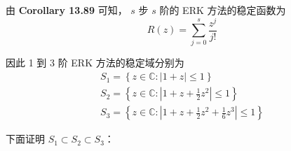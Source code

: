\documentclass[a4paper]{article}
\begin{document}
\par 由 \textbf{Corollary 13.89} 可知， 
$s$ 步 $s$ 阶的 ERK 方法的稳定函数为
\begin{equation}
    R(z) = \sum_{j=0}^s \frac{z^j}{j!}
\end{equation}
\par 因此 1 到 3 阶 ERK 方法的稳定域分别为
\begin{gather}
    S_1 = \left\{z \in \mathbb{C} : \left|1+z\right| \leq 1\right\} \\
    S_2 = \left\{z \in \mathbb{C} : \left|1+z+\frac{1}{2} z^2\right| \leq 1\right\} \\
    S_3 = \left\{z \in \mathbb{C} : \left|1+z+\frac{1}{2} z^2 + \frac{1}{6} z^3\right| \leq 1\right\}
\end{gather}
\par 下面证明 $S_1 \subset S_2 \subset S_3$：
\end{document}
